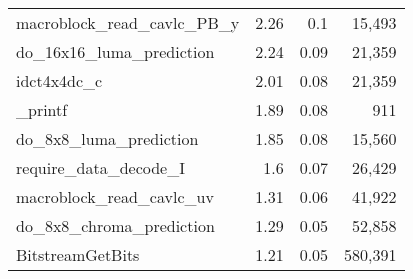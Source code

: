 \begin{longtable}[\textwidth]{lrrr}
    macroblock\_read\_cavlc\_PB\_y
    								&	2.26 	&	0.1  	&	15,493		\\ \rowcolor{gray!15}
    do\_16x16\_luma\_prediction	&	2.24 	&	0.09 	&	21,359		\\
    idct4x4dc\_c					&	2.01 	&	0.08 	&	21,359		\\ \rowcolor{gray!15}
    \_printf						&	1.89 	&	0.08 	&	911			\\
    do\_8x8\_luma\_prediction		&	1.85 	&	0.08 	&	15,560		\\ \rowcolor{gray!15}
    require\_data\_decode\_I		&	1.6  	&	0.07 	&	26,429		\\
    macroblock\_read\_cavlc\_uv	&	1.31 	&	0.06 	&	41,922		\\ \rowcolor{gray!15}
    do\_8x8\_chroma\_prediction	&	1.29 	&	0.05 	&	52,858		\\
    BitstreamGetBits				&	1.21 	&	0.05 	&	580,391		\\
    \bottomrule[1.5pt]
\end{longtable}
